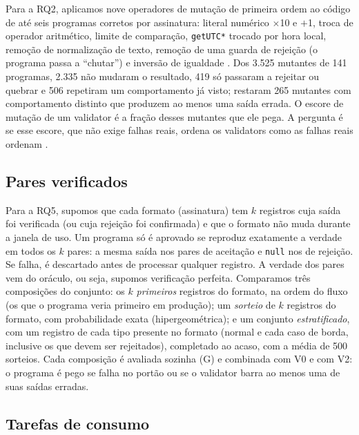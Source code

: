 \documentclass[sigconf,nonacm]{acmart}
\begin{document}
Para a RQ2, aplicamos nove operadores de mutação de primeira ordem ao código de até seis programas corretos por assinatura: literal numérico $\times$10 e $+$1, troca de operador aritmético, limite de comparação, \texttt{getUTC*} trocado por hora local, remoção de normalização de texto, remoção de uma guarda de rejeição (o programa passa a ``chutar'') e inversão de igualdade \cite{jia2011mutation}. Dos 3.525 mutantes de 141 programas, 2.335 não mudaram o resultado, 419 só passaram a rejeitar ou quebrar e 506 repetiram um comportamento já visto; restaram 265 mutantes com comportamento distinto que produzem ao menos uma saída errada. O escore de mutação de um validator é a fração desses mutantes que ele pega. A pergunta é se esse escore, que não exige falhas reais, ordena os validators como as falhas reais ordenam \cite{just2014mutants}.

\subsection{Pares verificados}
\label{sec:desenho-golden}

Para a RQ5, supomos que cada formato (assinatura) tem $k$ registros cuja saída foi verificada (ou cuja rejeição foi confirmada) e que o formato não muda durante a janela de uso. Um programa só é aprovado se reproduz exatamente a verdade em todos os $k$ pares: a mesma saída nos pares de aceitação e \texttt{null} nos de rejeição. Se falha, é descartado antes de processar qualquer registro. A verdade dos pares vem do oráculo, ou seja, supomos verificação perfeita. Comparamos três composições do conjunto: os $k$ \textit{primeiros} registros do formato, na ordem do fluxo (os que o programa veria primeiro em produção); um \textit{sorteio} de $k$ registros do formato, com probabilidade exata (hipergeométrica); e um conjunto \textit{estratificado}, com um registro de cada tipo presente no formato (normal e cada caso de borda, inclusive os que devem ser rejeitados), completado ao acaso, com a média de 500 sorteios. Cada composição é avaliada sozinha (G) e combinada com V0 e com V2: o programa é pego se falha no portão ou se o validator barra ao menos uma de suas saídas erradas.

\subsection{Tarefas de consumo}
\label{sec:desenho-tarefas}
\end{document}

